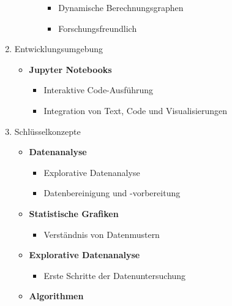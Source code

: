 \documentclass{vorlage-design-main}
\begin{document}
\begin{enumerate}
\begin{itemize}
\begin{itemize}
\begin{itemize}
      \item
        Dynamische Berechnungsgraphen
      \item
        Forschungsfreundlich
      \end{itemize}
    \end{itemize}
  \end{itemize}
\item
  Entwicklungsumgebung

  \begin{itemize}

  \item
    \textbf{Jupyter Notebooks}

    \begin{itemize}

    \item
      Interaktive Code-Ausführung
    \item
      Integration von Text, Code und Visualisierungen
    \end{itemize}
  \end{itemize}
\item
  Schlüsselkonzepte

  \begin{itemize}

  \item
    \textbf{Datenanalyse}

    \begin{itemize}

    \item
      Explorative Datenanalyse
    \item
      Datenbereinigung und -vorbereitung
    \end{itemize}
  \item
    \textbf{Statistische Grafiken}

    \begin{itemize}

    \item
      Verständnis von Datenmustern
    \end{itemize}
  \item
    \textbf{Explorative Datenanalyse}

    \begin{itemize}

    \item
      Erste Schritte der Datenuntersuchung
    \end{itemize}
  \item
    \textbf{Algorithmen}

    \begin{itemize}


\end{itemize}
\end{itemize}
\end{enumerate}
\end{document}
